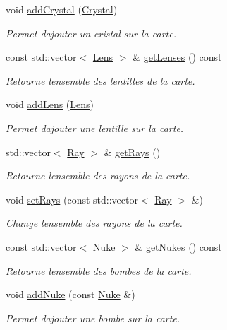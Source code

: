 \begin{DoxyCompactItemize}
void \hyperlink{classLevel_a2effcce70c0492609a9ecc403abcff70}{add\+Crystal} (\hyperlink{classCrystal}{Crystal})
\begin{DoxyCompactList}\small\item\em Permet d\textquotesingle{}ajouter un cristal sur la carte. \end{DoxyCompactList}\item 
const std\+::vector$<$ \hyperlink{classLens}{Lens} $>$ \& \hyperlink{classLevel_a9e8fa9a3da391138768af00f00e6c77b}{get\+Lenses} () const 
\begin{DoxyCompactList}\small\item\em Retourne l\textquotesingle{}ensemble des lentilles de la carte. \end{DoxyCompactList}\item 
void \hyperlink{classLevel_ae09f20a51cd8cb01244101f7ea7a1cef}{add\+Lens} (\hyperlink{classLens}{Lens})
\begin{DoxyCompactList}\small\item\em Permet d\textquotesingle{}ajouter une lentille sur la carte. \end{DoxyCompactList}\item 
std\+::vector$<$ \hyperlink{classRay}{Ray} $>$ \& \hyperlink{classLevel_ad2fa2a31db061681a3f237c80c348b46}{get\+Rays} ()
\begin{DoxyCompactList}\small\item\em Retourne l\textquotesingle{}ensemble des rayons de la carte. \end{DoxyCompactList}\item 
void \hyperlink{classLevel_a6528bd0b23a291644f7cb4278101af70}{set\+Rays} (const std\+::vector$<$ \hyperlink{classRay}{Ray} $>$ \&)
\begin{DoxyCompactList}\small\item\em Change l\textquotesingle{}ensemble des rayons de la carte. \end{DoxyCompactList}\item 
const std\+::vector$<$ \hyperlink{classNuke}{Nuke} $>$ \& \hyperlink{classLevel_ac1a78a1e0071ab24698705257cf82260}{get\+Nukes} () const 
\begin{DoxyCompactList}\small\item\em Retourne l\textquotesingle{}ensemble des bombes de la carte. \end{DoxyCompactList}\item 
void \hyperlink{classLevel_ac35e7ed887e6f823a08c987f17535e32}{add\+Nuke} (const \hyperlink{classNuke}{Nuke} \&)
\begin{DoxyCompactList}\small\item\em Permet d\textquotesingle{}ajouter une bombe sur la carte. \end{DoxyCompactList}\item 

\end{DoxyCompactItemize}
